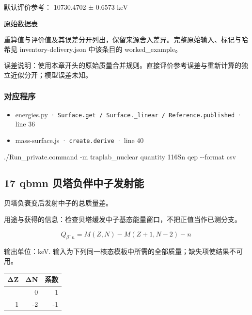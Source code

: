 \documentclass[
  11pt,
  letterpaper,
]{article}
\newenvironment{Shaded}{}{}
\newcommand{\AttributeTok}[1]{\textcolor[rgb]{0.49,0.56,0.16}{#1}}
\newcommand{\ExtensionTok}[1]{#1}
\newcommand{\NormalTok}[1]{#1}
\providecommand{\tightlist}{%
  \setlength{\itemsep}{0pt}\setlength{\parskip}{0pt}}
\begin{document}
默认评价参考：-10730.4702 ± 0.6573 keV

\href{https://www-nds.iaea.org/amdc/ame2020/rct1.mas20.txt}{原始数据表}

重算值与评价值及其误差分开列出，保留来源舍入差异。完整原始输入、标记与哈希见
inventory-delivery.json 中该条目的 worked\_example。

误差说明：使用本章开头的原始质量合并规则。直接评价参考误差与重新计算的独立近似分开；模型误差未知。

\subsubsection{对应程序}\label{ux5bf9ux5e94ux7a0bux5e8f-15}

\begin{itemize}
\tightlist
\item
  energies.py ·
  \texttt{Surface.get\ /\ Surface.\_linear\ /\ Reference.published} ·
  line 36
\item
  mass-surface.js · \texttt{create.derive} · line 40
\end{itemize}

\begin{Shaded}
\begin{Highlighting}[]
\ExtensionTok{./Run\_private.command} \AttributeTok{{-}m}\NormalTok{ traplab\_nuclear quantity 116Sn qep }\AttributeTok{{-}{-}format}\NormalTok{ csv}
\end{Highlighting}
\end{Shaded}

\subsection{17 qbmn
贝塔负伴中子发射能}\label{qbmn-ux8d1dux5854ux8d1fux4f34ux4e2dux5b50ux53d1ux5c04ux80fd}

贝塔负衰变后发射中子的总质量差。

用途与获得的信息：检查贝塔缓发中子基态能量窗口，不把正值当作已测分支。

\[
Q_{\beta^-n}=M(Z,N)-M(Z+1,N-2)-n
\]

输出单位：keV.
输入为下列同一核态模板中所需的全部质量；缺失项使结果不可用。

\begin{longtable}[]{@{}rrr@{}}
\toprule\noalign{}
ΔZ & ΔN & 系数 \\
\midrule\noalign{}
\endhead
\bottomrule\noalign{}
\endlastfoot
0 & 0 & 1 \\
1 & -2 & -1 \\
\end{longtable}
\end{document}
